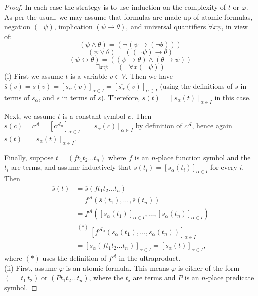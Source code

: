 \documentclass{article}
\def\A{\mathcal A}
\begin{document}
\begin{proof}
In each case the strategy is to use induction on the complexity of $t$ or $\varphi$.  As per the usual, we may assume that formulas are made up of atomic formulas, negation $(\neg\psi)$, implication $(\psi\to\theta)$, and universal quantifiers $\forall x\psi$, in view of:
$$(\psi\wedge\theta)=(\neg(\psi\to(\neg\theta)))$$
$$(\psi\vee\theta)=((\neg\psi)\to\theta)$$
$$(\psi\leftrightarrow\theta)=((\psi\to\theta)\wedge(\theta\to\psi))$$
$$\exists x\psi=(\neg\forall x(\neg\psi))$$
(i) First we assume $t$ is a variable $v\in V$.  Then we have $\overline s(v)=s(v)=[s_\alpha(v)]_{\alpha\in I}=[\overline{s_\alpha}(v)]_{\alpha\in I}$ (using the definitions of $s$ in terms of $s_\alpha$, and $\overline s$ in terms of $s$).  Therefore, $\overline s(t)=[\overline{s_\alpha}(t)]_{\alpha\in I}$ in this case.

Next, we assume $t$ is a constant symbol $c$.  Then $\overline s(c)=c^\A=[c^{\A_\alpha}]_{\alpha\in I}=[\overline{s_\alpha}(c)]_{\alpha\in I}$ by definition of $c^\A$, hence again $\overline s(t)=[\overline{s_\alpha}(t)]_{\alpha\in I}$.

Finally, suppose $t=(ft_1t_2\dots t_n)$ where $f$ is an $n$-place function symbol and the $t_i$ are terms, and assume inductively that $\overline s(t_i)=[\overline{s_\alpha}(t_i)]_{\alpha\in I}$ for every $i$.  Then
\begin{align*}
\overline s(t)
&=\overline s(ft_1t_2\dots t_n)\\
&=f^\A(\overline s(t_1),\dots,\overline s(t_n))\\
&=f^\A\left([\overline{s_\alpha}(t_1)]_{\alpha\in I},\dots,[\overline{s_\alpha}(t_n)]_{\alpha\in I}\right)\\
&\overset{(*)}=\left[f^{\A_\alpha}\left(\overline{s_\alpha}(t_1),\dots,\overline{s_\alpha}(t_n)\right)\right]_{\alpha\in I}\\
&=\left[\overline{s_\alpha}(ft_1t_2\dots t_n)\right]_{\alpha\in I}=[\overline{s_\alpha}(t)]_{\alpha\in I},
\end{align*}
where $(*)$ uses the definition of $f^\A$ in the ultraproduct.\\

\noindent(ii) First, assume $\varphi$ is an atomic formula.  This means $\varphi$ is either of the form $(=\,t_1\,t_2)$ or $(Pt_1t_2\dots t_n)$, where the $t_i$ are terms and $P$ is an $n$-place predicate symbol.


\end{proof}
\end{document}
